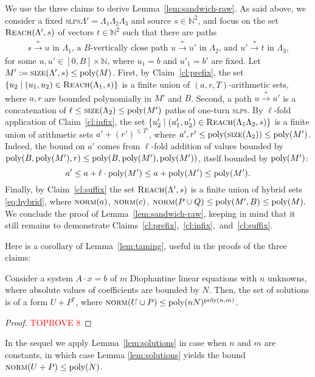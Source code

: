 \documentclass[a4paper, UKenglish, cleveref, autoref, thm-restate]{lipics-v2021}
\newcommand{\N}{\mathbb{N}}
\newcommand{\reach}{\textsc{Reach}}
\newcommand{\trans}[1]{\stackrel{#1}{\longrightarrow}}
\newcommand{\tran}{\trans{*}}
\newcommand{\slps}{\textsc{slps}\xspace}
\newcommand{\norm}{\textsc{norm}}
\newcommand{\size}{\textsc{size}}
\newcommand{\poly}{\textup{poly}}
\newcommand{\setfromto}[2]{[#1, #2]}
\begin{document}
\begin{appendixproof}
We use the three  claims to derive Lemma~\ref{lem:sandwich-raw}.
As said above,
we consider a fixed \slps $\Lambda' = \Lambda_1 \Lambda_2 \Lambda_3$ and source $s\in\N^2$,
and focus on the set $\reach(\Lambda', s)$ of vectors $t\in\N^2$ such that
there are paths 
\begin{align} \label{eq:paths}
\text{$s \tran u$ in $\Lambda_1$,  \ \  
a $B$-vertically close path $u \tran u'$ in $\Lambda_2$, \ \ 
and   $u'\tran t$ in $\Lambda_3$,}
\end{align}
for some $u,u'\in \setfromto 0 B \times \N$, where 
$u_1 = b$ and $u'_1 = b'$ are fixed.
Let $M':=\size(\Lambda',s) \leq \poly(M)$.
First, by Claim~\ref{cl:prefix}, the set
$\{u_2 \mid (u_1, u_2) \in \reach(\Lambda_1,s)\}$ is a finite union of $(a, r, T)$-arithmetic sets,
where $a, r$ are bounded polynomially in $M'$ and $B$.
Second,
a path $u\tran u'$ is a concatenation of $\ell\leq \size(\Lambda_2) \leq \poly(M')$
paths of one-turn \slps. 
By $\ell$-fold application of Claim~\ref{cl:infix}, the set
$\{u'_2 \mid (u'_1, u'_2) \in \reach(\Lambda_1 \Lambda_2,s)\}$
is a finite union of arithmetic sets
$a' + (r')^{\leq T'}$, where
$a', r' \leq \poly(\size(\Lambda_2)) \leq \poly(M')$.
Indeed, the bound on $a'$ comes from $\ell$-fold addition of values bounded by 
$\poly(B, \poly(M'), r)\leq \poly(B, \poly(M'), \poly(M'))$,
itself bounded by $\poly(M')$:
\begin{equation}\label{eq:aprim}
a' \leq a + \ell \cdot \poly(M') \leq a + \poly(M') \leq \poly(M').
\end{equation}
Finally, by Claim~\ref{cl:suffix} the set $\reach(\Lambda',s)$ is a finite union of hybrid sets \eqref{eq:hybrid},
where
$
\norm(a)$, $\norm(c)$, $\norm(P \cup Q) \leq \poly(M', B) \leq \poly(M).
$ 
We conclude the proof of Lemma~\ref{lem:sandwich-raw}, keeping in mind that
it still remains to demonstrate Claims~\ref{cl:prefix},~\ref{cl:infix},~and~\ref{cl:suffix}.

\medskip

Here is  a corollary of Lemma~\ref{lem:taming}, useful in the proofs of the three claims:
\begin{lemma}\label{lem:solutions}
Consider a system $A\cdot x = b$ of $m$ Diophantine linear equations with $n$ unknowns,
where absolute values of coefficients are bounded by $N$.
Then, the set of solutions is of a form $U+P^*$, where
$\norm(U \cup P) \leq \poly(nN)^{\poly(n,m)}$.
\end{lemma}

\begin{proof}\textcolor{red}{TOPROVE 8}\end{proof}
In the sequel we apply Lemma~\ref{lem:solutions} in case when $n$ and $m$ are constants,
in which case Lemma \ref{lem:solutions} yields the bound $\norm(U+P) \leq \poly(N)$.


\end{appendixproof}
\end{document}
